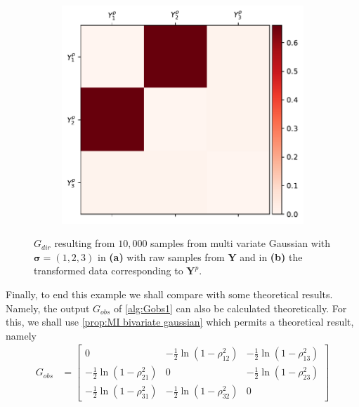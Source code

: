 \documentclass[../Thesis.tex]{subfiles}
\begin{document}
\begin{example}
\begin{figure}[H]
\begin{subfigure}[t]{0.49\textwidth}
            \includegraphics[width=\linewidth]{figures/ND examples/Gaussian 3x3 large s power.pdf}
            \caption{}
            \label{fig:Gaussian 3x3 large s power}
        \end{subfigure}
        \caption{$G_{dir}$ resulting from $10{,}000$ samples from multi variate Gaussian with $\boldsymbol\sigma = (1,2,3)$ in \textbf{(a)} with raw samples from $\boldsymbol Y$ and in \textbf{(b)} the transformed data corresponding to $\boldsymbol Y^p$.}
        \label{fig:Gaussian 3x3 large s G_dir differences}
    \end{figure}
    Finally, to end this example we shall compare with some theoretical results. Namely, the output $G_{obs}$ of \autoref{alg:Gobs1} can also be calculated theoretically. For this, we shall use \autoref{prop:MI bivariate gaussian} which permits a theoretical result, namely
    \begin{align*}
        G_{obs} & =
        \begin{bmatrix}
            0                                              & -\frac{1}{2} \ln \left( 1 - \rho_{12}^2\right) & -\frac{1}{2} \ln \left( 1 - \rho_{13}^2\right) \\
            -\frac{1}{2} \ln \left( 1 - \rho_{21}^2\right) & 0                                              & -\frac{1}{2} \ln \left( 1 - \rho_{23}^2\right) \\
            -\frac{1}{2} \ln \left( 1 - \rho_{31}^2\right) & -\frac{1}{2} \ln \left( 1 - \rho_{32}^2\right) & 0

\end{bmatrix}
\end{align*}
\end{example}
\end{document}
